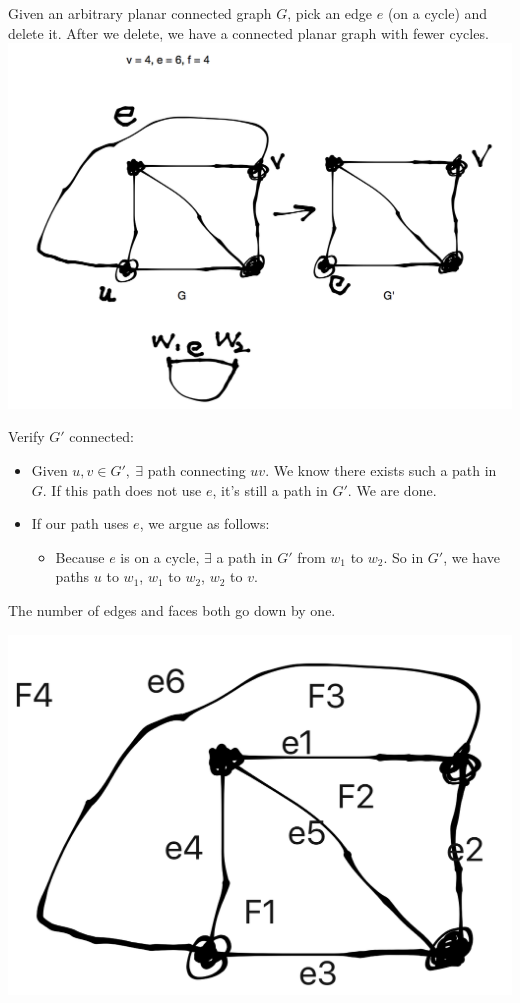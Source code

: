\documentclass[a4paper, 11pt, twoside]{article}
\begin{document}
Given an arbitrary planar connected graph $G$, pick an edge $e$ (on a cycle) and delete it. After we delete, we have a connected planar graph with fewer cycles.\\

\includegraphics[width=\textwidth]{images/faces.png}

Verify $G'$ connected:

\begin{itemize}
	\item Given $u,v\in G',\ \exists$ path connecting $uv$. We know there exists such a path in $G$. If this path does not use $e$, it's still a path in $G'$. We are done.
	\item If our path uses $e$, we argue as follows:
	\begin{itemize}
		\item Because $e$ is on a cycle, $\exists$ a path in $G'$ from $w_1$ to $w_2$. So in $G'$, we have paths $u$ to $w_1$, $w_1$ to $w_2$, $w_2$ to $v$.
	\end{itemize}
\end{itemize}

The number of edges and faces both go down by one.

\includegraphics[width=\textwidth]{images/faces2}
\end{document}
